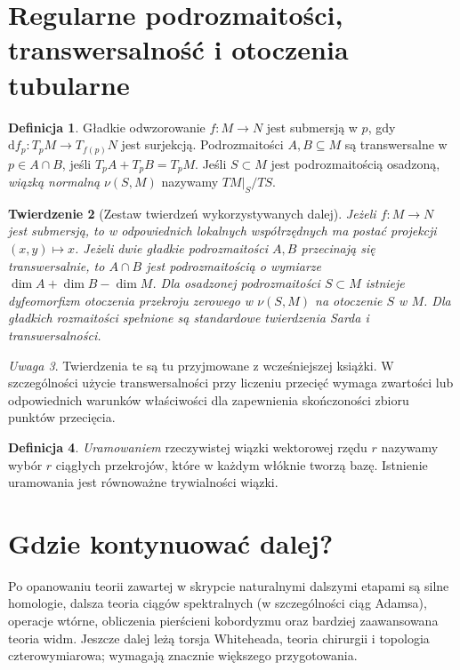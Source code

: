 \documentclass[11pt,a4paper,oneside]{report}
\theoremstyle{plain}
\newtheorem{twierdzenie}{Twierdzenie}[section]
\theoremstyle{definition}
\newtheorem{definicja}[twierdzenie]{Definicja}
\theoremstyle{remark}
\newtheorem{uwaga}[twierdzenie]{Uwaga}
\begin{document}
\section{Regularne podrozmaitości, transwersalność i otoczenia tubularne}
\begin{definicja}
Gładkie odwzorowanie $f:M\to N$ jest submersją w $p$, gdy
$\mathrm df_p:T_pM\to T_{f(p)}N$ jest surjekcją.
Podrozmaitości $A,B\subseteq M$ są transwersalne w $p\in A\cap B$,
jeśli $T_pA+T_pB=T_pM$.
Jeśli $S\subset M$ jest podrozmaitością osadzoną,
\emph{wiązką normalną} $\nu(S,M)$ nazywamy $TM|_S/TS$.
\end{definicja}
\begin{twierdzenie}[Zestaw twierdzeń wykorzystywanych dalej]
Jeżeli $f:M\to N$ jest submersją, to w odpowiednich lokalnych
współrzędnych ma postać projekcji $(x,y)\mapsto x$.
Jeżeli dwie gładkie podrozmaitości $A,B$ przecinają się transwersalnie,
to $A\cap B$ jest podrozmaitością o wymiarze $\dim A+\dim B-\dim M$.
Dla osadzonej podrozmaitości $S\subset M$ istnieje dyfeomorfizm
otoczenia przekroju zerowego w $\nu(S,M)$ na otoczenie $S$ w $M$.
Dla gładkich rozmaitości spełnione są standardowe twierdzenia
Sarda i transwersalności.
\end{twierdzenie}
\begin{uwaga}
Twierdzenia te są tu przyjmowane z wcześniejszej książki.
W szczególności użycie transwersalności przy liczeniu przecięć
wymaga zwartości lub odpowiednich warunków właściwości dla
zapewnienia skończoności zbioru punktów przecięcia.
\end{uwaga}

\begin{definicja}
\emph{Uramowaniem} rzeczywistej wiązki wektorowej rzędu $r$
nazywamy wybór $r$ ciągłych przekrojów, które w każdym włóknie
tworzą bazę. Istnienie uramowania jest równoważne trywialności wiązki.
\end{definicja}

\section{Gdzie kontynuować dalej?}
Po opanowaniu teorii zawartej w skrypcie naturalnymi dalszymi etapami są
silne homologie, dalsza teoria ciągów spektralnych
(w szczególności ciąg Adamsa), operacje wtórne,
obliczenia pierścieni kobordyzmu oraz bardziej zaawansowana teoria widm.
Jeszcze dalej leżą torsja Whiteheada, teoria chirurgii
i topologia czterowymiarowa; wymagają znacznie większego przygotowania.
\end{document}
